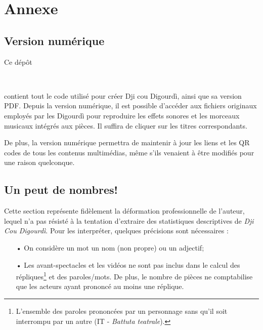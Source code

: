\chapter*{Annexe}
\section*{Version numérique}\label{vers_num}
Ce dépôt
\begin{center}
\centering
\github\ \hspace*{0.5mm} \href{\detokenize{https://github.com/jbollon/Dji-cou-Digourdi}}{} \hspace*{0.5mm} \github\\
 \vspace*{2mm}
\end{center}
\noindent  contient tout le code utilisé pour créer Dji cou Digourdì, ainsi que sa version PDF. Depuis la version numérique, il est possible d'accéder aux fichiers originaux employés par les Digourdì pour reproduire les effets sonores et les morceaux musicaux intégrés aux pièces. Il suffira de cliquer sur les titres correspondants.

De plus, la version numérique permettra de maintenir à jour les liens et les QR codes de tous les contenus multimédias, même s'ils venaient à être modifiés pour une raison quelconque.
\newpage
\section*{Un peut de nombres!}
Cette section représente fidèlement la déformation professionnelle de l'auteur, lequel n'a pas résisté à la tentation d'extraire des statistiques descriptives de \textit{Dji Cou Digourdì}. Pour les interpréter, quelques précisions sont nécessaires :
\begin{itemize}
\item[•] On considère un mot un nom (non propre) ou un adjectif;
\item[•] Les avant-spectacles et les vidéos ne sont pas inclus dans le calcul des répliques\footnote{ L'ensemble des paroles prononcées par un personnage sans qu'il soit interrompu par un autre (IT - \textit{Battuta teatrale}).} et des paroles/mots. De plus, le nombre de pièces ne comptabilise que les acteurs ayant prononcé au moins une réplique.
\end{itemize}